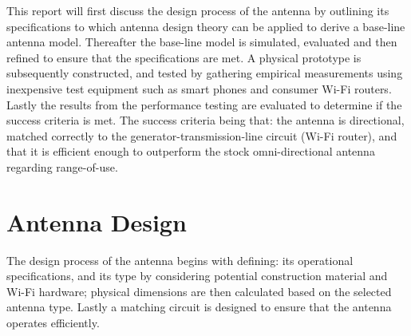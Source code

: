 \documentclass[10pt,twocolumn,hidelinks]{witseiepaper}
\begin{document}
This report will first discuss the design process of the antenna by
outlining its specifications to which antenna design theory can be applied
to derive a base-line antenna model. Thereafter the base-line model is
simulated, evaluated and then refined to ensure that the specifications are
met. A physical prototype is subsequently constructed, and tested by
gathering empirical measurements using inexpensive test equipment such as
smart phones and consumer Wi-Fi routers. Lastly the results from the
performance testing are evaluated to determine if the success criteria is
met. The success criteria being that: the antenna is directional, matched
correctly to the generator-transmission-line circuit (Wi-Fi router), and
that it is efficient enough to outperform the stock omni-directional
antenna regarding range-of-use.


\section{Antenna Design}

The design process of the antenna begins with defining: its operational
specifications, and its type by considering potential construction material
and Wi-Fi hardware; physical dimensions are then calculated based on the
selected antenna type. Lastly a matching circuit is designed to ensure that
the antenna operates efficiently.
\end{document}
